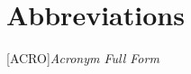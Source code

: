 \frontmatter  %

\tableofcontents

\pagebreak
\chapter*{Abbreviations}

\begin{acronym}[ThisIsQuiteLongEnough]
	[ACRO]{\textit{Acronym Full Form}}
\end{acronym}

\iffalse
\chapter*{Glossary}
\begin{acronym}[ThisIsQuiteLongEnough]
	\setstretch{1.25}
	\acro{xxxLABLExxx}%
	[Term]{%
		Definition.
	}
\end{acronym}
\fi

\pagebreak
\lstlistoflistings
\pagebreak
\listoffigures

\mainmatter %
